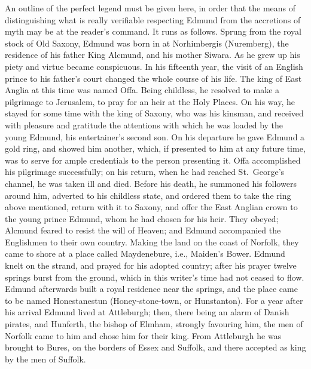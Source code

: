 \documentclass[10pt]{book}
\begin{document}
{An outline of the perfect legend must be given here,  in order that the means of distinguishing what is really verifiable respecting Edmund from the accretions of myth may be at the reader's command. It runs as follows. Sprung from the royal stock of Old Saxony, Edmund was born in  at Norhimbergis (Nuremberg), the residence of his father King Alcmund, and his mother Siwara. As he grew up his piety and virtue became conspicuous. In his fifteenth year, the visit of an English prince to his father's court changed the whole course of his life. The king of East Anglia at this time was named Offa. Being childless, he resolved to make a pilgrimage to Jerusalem, to pray for an heir at the Holy Places. On his way, he stayed for some time with the king of Saxony, who was his kinsman, and received with pleasure and gratitude the attentions with which he was loaded by the young Edmund, his entertainer's second son. On his departure he gave Edmund a gold ring, and showed him another, which, if presented to him at any future time, was to serve for ample credentials to the person presenting it. Offa accomplished his pilgrimage successfully; on his return, when he had reached St.\ George's channel, he was taken ill and died. Before his death, he summoned his followers around him, adverted to his childless state, and ordered them to take the ring above mentioned, return with it to Saxony, and offer the East Anglian crown to the young prince Edmund, whom he had chosen for his heir. They obeyed; Alcmund feared to resist the will of Heaven; and Edmund accompanied the Englishmen to their own country. Making the land on the coast of Norfolk, they came to shore at a place called Maydenebure, i.e., Maiden's Bower. Edmund knelt on the strand, and prayed for his adopted country; after his prayer twelve springs burst from the ground, which in this writer's time had not ceased to flow. Edmund afterwards built a royal residence near the springs, and the place came to be named Honestanestun (Honey-stone-town, or Hunstanton). For a year after his arrival Edmund lived at Attleburgh; then, there being an alarm of Danish pirates, and Hunferth, the bishop of Elmham, strongly favouring him, the men of Norfolk came to him and chose him for their king. From Attleburgh he was brought to Bures, on the borders of Essex and Suffolk, and there accepted as king by the men of Suffolk.

}
\end{document}
